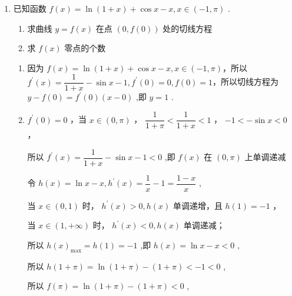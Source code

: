 \begin{enumerate}
\begin{enumerate}
        
        \item 已知函数 $f\left( x\right)  = \ln \left( {1 + x}\right)  + \cos x - x,x \in  \left( {-1,\pi }\right)$ .
        \begin{enumerate}
            \item 求曲线 $y = f\left( x\right)$ 在点 $\left( {0,f\left( 0\right) }\right)$ 处的切线方程
            \item 求 $f\left( x\right)$ 零点的个数
        \end{enumerate}
        \begin{jieda}
            \begin{enumerate}
                \item 因为 $f\left( x\right)  = \ln \left( {1 + x}\right)  + \cos x - x,x \in  \left( {-1,\pi }\right)$，所以 ${f}^{\prime }\left( x\right)  = \dfrac{1}{1 + x} - \sin x - 1,{f}^{\prime }\left( 0\right)  = 0,f\left( 0\right)  = 1$，所以切线方程为 $y - f\left( 0\right)  = {f}^{\prime }\left( 0\right) \left( {x - 0}\right)$ ,即 $y = 1$ .
                
                \item ${f}^{\prime }\left( 0\right)  = 0$ ，当 $x \in  \left( {0,\pi }\right)$ ， $\dfrac{1}{1 + \pi } < \dfrac{1}{1 + x} < 1$ ， $- 1 <  - \sin x < 0$ ，
                
                所以 ${f}^{\prime }\left( x\right)  = \dfrac{1}{1 + x} - \sin x - 1 < 0$ ,即 $f\left( x\right)$ 在 $\left( {0,\pi }\right)$ 上单调递减

                令 $h\left( x\right)  = \ln x - x,{h}^{\prime }\left( x\right)  = \dfrac{1}{x} - 1 = \dfrac{1 - x}{x}$ ,
                
                当 $x \in  \left( {0,1}\right)$ 时， ${h}^{\prime }\left( x\right)  > 0,h\left( x\right)$ 单调递增，且 $h\left( 1\right)  =  - 1$ ，
                
                当 $x \in  \left( {1, + \infty }\right)$ 时， ${h}^{\prime }\left( x\right)  < 0,h\left( x\right)$ 单调递减；
                
                所以 $h{\left( x\right) }_{\max } = h\left( 1\right)  =  - 1$ ,即 $h\left( x\right)  = \ln x - x < 0$ ,
                
                所以 $h\left( 1+\pi \right)  = \ln \left( {1 + \pi }\right)  - \left( {1 + \pi }\right)  <  - 1 < 0$ ,
                
                所以 $f\left( \pi \right)  = \ln \left( {1 + \pi }\right)  - \left( {1 + \pi }\right)  < 0$ ,
                

\end{enumerate}
\end{jieda}
\end{enumerate}
\end{enumerate}
